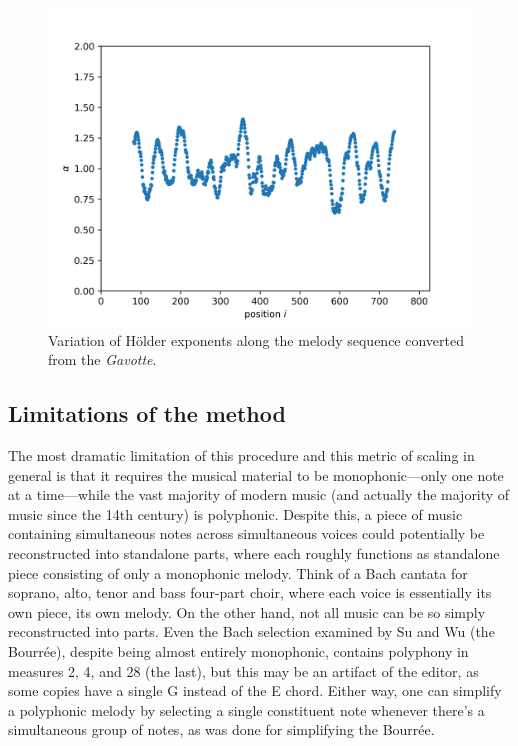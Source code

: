 \documentclass{article}
\begin{document}
\begin{figure}[ht!]
    \centering
    \includegraphics[width=\linewidth]{figures/results03.png}
    \caption{%
        Variation of Hölder exponents along the melody sequence converted from
        the \emph{Gavotte}.
    }\label{fig:results_3}
\end{figure}

\subsection{Limitations of the method}

The most dramatic limitation of this procedure and this metric of scaling in
general is that it requires the musical material to be monophonic---only one
note at a time---while the vast majority of modern music (and actually the
majority of music since the 14th century) is polyphonic. Despite this, a piece
of music containing simultaneous notes across simultaneous voices could
potentially be reconstructed into standalone parts, where each roughly functions
as standalone piece consisting of only a monophonic melody. Think of a Bach
cantata for soprano, alto, tenor and bass four-part choir, where each voice is
essentially its own piece, its own melody. On the other hand, not all music can
be so simply reconstructed into parts. Even the Bach selection examined by Su
and Wu (the Bourrée), despite being almost entirely monophonic, contains
polyphony in measures 2, 4, and 28 (the last), but this may be an artifact of
the editor, as some copies have a single G instead of the E chord. Either way,
one can simplify a polyphonic melody by selecting a single constituent note
whenever there's a simultaneous group of notes, as was done for simplifying the
Bourrée.
\end{document}
